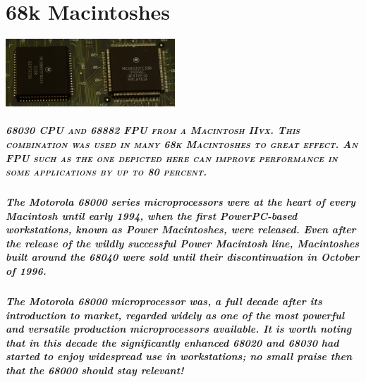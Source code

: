 
\chapter{68k Macintoshes}

\begin{center}
\includegraphics[height=1in]{68k/68030-68882-33.pdf} \\
\end{center}

\paragraph{\scriptsize{\textsc{%
68030 CPU and 68882 FPU from a Macintosh IIvx. This combination %
was used in many 68k Macintoshes to great effect. An FPU such as %
the one depicted here can improve performance in some applications %
by up to 80 percent.}}}

\paragraph{%
The Motorola 68000 series microprocessors were at the heart of every Macintosh %
until early 1994, when the first PowerPC-based workstations, known as Power %
Macintoshes, were released. Even after the release of the wildly successful %
Power Macintosh line, Macintoshes built around the 68040 were sold until %
their discontinuation in October of 1996. %
}

\paragraph{%
The Motorola 68000 microprocessor was, a full decade after its introduction to %
market, regarded widely as one of the most powerful and versatile production %
microprocessors available. It is worth noting that in this decade the %
significantly enhanced 68020 and 68030 had started to enjoy widespread use %
in workstations; no small praise then that the 68000 should stay relevant! %
}

